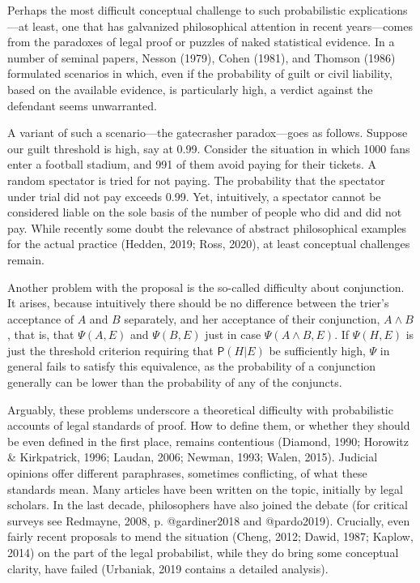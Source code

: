 \documentclass[11pt,dvipsnames,enabledeprecatedfontcommands]{scrartcl}
\newcommand{\pr}[1]{\mathsf{P}(#1)}
\begin{document}
Perhaps the most difficult conceptual challenge to such probabilistic
explications---at least, one that has galvanized philosophical attention
in recent years---comes from the paradoxes of legal proof or puzzles of
naked statistical evidence. In a number of seminal papers, Nesson
(1979), Cohen (1981), and Thomson (1986) formulated scenarios in which,
even if the probability of guilt or civil liability, based on the
available evidence, is particularly high, a verdict against the
defendant seems unwarranted.

A variant of such a scenario---the gatecrasher paradox---goes as
follows. Suppose our guilt threshold is high, say at 0.99. Consider the
situation in which 1000 fans enter a football stadium, and 991 of them
avoid paying for their tickets. A random spectator is tried for not
paying. The probability that the spectator under trial did not pay
exceeds 0.99. Yet, intuitively, a spectator cannot be considered liable
on the sole basis of the number of people who did and did not pay. While
recently some doubt the relevance of abstract philosophical examples for
the actual practice (Hedden, 2019; Ross, 2020), at least conceptual
challenges remain.

Another problem with the proposal is the so-called difficulty about
conjunction. It arises, because intuitively there should be no
difference between the trier's acceptance of \(A\) and \(B\) separately,
and her acceptance of their conjunction, \(A\wedge B\) , that is, that
\(\Psi(A,E)\) and \(\Psi(B,E)\) just in case \(\Psi(A\wedge B, E)\). If
\(\Psi(H,E)\) is just the threshold criterion requiring that
\(\pr{H\vert E}\) be sufficiently high, \(\Psi\) in general fails to
satisfy this equivalence, as the probability of a conjunction generally
can be lower than the probability of any of the conjuncts.

Arguably, these problems underscore a theoretical difficulty with
probabilistic accounts of legal standards of proof. How to define them,
or whether they should be even defined in the first place, remains
contentious (Diamond, 1990; Horowitz \& Kirkpatrick, 1996; Laudan, 2006;
Newman, 1993; Walen, 2015). Judicial opinions offer different
paraphrases, sometimes conflicting, of what these standards mean. Many
articles have been written on the topic, initially by legal scholars. In
the last decade, philosophers have also joined the debate (for critical
surveys see Redmayne, 2008, p. @gardiner2018 and @pardo2019). Crucially,
even fairly recent proposals to mend the situation (Cheng, 2012; Dawid,
1987; Kaplow, 2014) on the part of the legal probabilist, while they do
bring some conceptual clarity, have failed (Urbaniak, 2019 contains a
detailed analysis).
\end{document}
